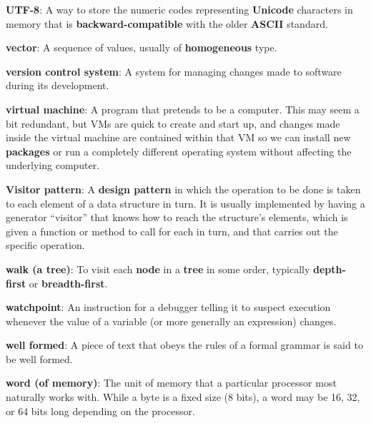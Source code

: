 \documentclass[krantzl]{krantz}
\newcommand{\glosskey}[1]{\textbf{#1}}
\begin{document}
\noindent \textbf{{\newline}\glosskey{UTF-8}}: 
A way to store the numeric codes representing \glosskey{Unicode} characters in memory that is \glosskey{backward-compatible} with the older \glosskey{ASCII} standard.


\noindent \textbf{{\newline}\glosskey{vector}}: 
A sequence of values, usually of \glosskey{homogeneous} type.


\noindent \textbf{{\newline}\glosskey{version control system}}: 
A system for managing changes made to software during its development.


\noindent \textbf{{\newline}\glosskey{virtual machine}}: 
A program that pretends to be a computer. This may seem a bit redundant, but VMs are quick to create and start up, and changes made inside the virtual machine are contained within that VM so we can install new \glosskey{packages} or run a completely different operating system without affecting the underlying computer.


\noindent \textbf{{\newline}\glosskey{Visitor pattern}}: 
A \glosskey{design pattern} in which the operation to be done is taken to each element of a data structure in turn. It is usually implemented by having a generator “visitor” that knows how to reach the structure’s elements, which is given a function or method to call for each in turn, and that carries out the specific operation.


\noindent \textbf{{\newline}\glosskey{walk (a tree)}}: 
To visit each \glosskey{node} in a \glosskey{tree} in some order, typically \glosskey{depth-first} or \glosskey{breadth-first}.


\noindent \textbf{{\newline}\glosskey{watchpoint}}: 
An instruction for a debugger telling it to suspect execution whenever the value of a variable (or more generally an expression) changes.


\noindent \textbf{{\newline}\glosskey{well formed}}: 
A piece of text that obeys the rules of a formal grammar is said to be well formed.


\noindent \textbf{{\newline}\glosskey{word (of memory)}}: 
The unit of memory that a particular processor most naturally works with. While a byte is a fixed size (8 bits), a word may be 16, 32, or 64 bits long depending on the processor.
\end{document}
